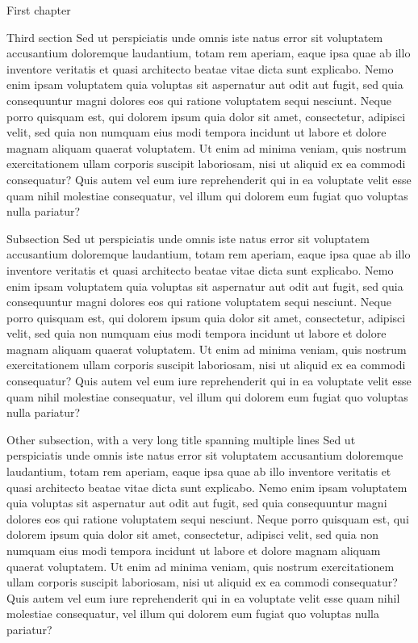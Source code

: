 \documentclass{article}
\begin{document}
\begin{mychapter}{First chapter}
	\begin{mysection}{Third section}
Sed ut perspiciatis unde omnis iste natus error sit voluptatem accusantium doloremque laudantium, totam rem aperiam, eaque ipsa quae ab illo inventore veritatis et quasi architecto beatae vitae dicta sunt explicabo. Nemo enim ipsam voluptatem quia voluptas sit aspernatur aut odit aut fugit, sed quia consequuntur magni dolores eos qui ratione voluptatem sequi nesciunt. Neque porro quisquam est, qui dolorem ipsum quia dolor sit amet, consectetur, adipisci velit, sed quia non numquam eius modi tempora incidunt ut labore et dolore magnam aliquam quaerat voluptatem. Ut enim ad minima veniam, quis nostrum exercitationem ullam corporis suscipit laboriosam, nisi ut aliquid ex ea commodi consequatur? Quis autem vel eum iure reprehenderit qui in ea voluptate velit esse quam nihil molestiae consequatur, vel illum qui dolorem eum fugiat quo voluptas nulla pariatur?
	\begin{mysubsection}{Subsection}
	Sed ut perspiciatis unde omnis iste natus error sit voluptatem accusantium doloremque laudantium, totam rem aperiam, eaque ipsa quae ab illo inventore veritatis et quasi architecto beatae vitae dicta sunt explicabo. Nemo enim ipsam voluptatem quia voluptas sit aspernatur aut odit aut fugit, sed quia consequuntur magni dolores eos qui ratione voluptatem sequi nesciunt. Neque porro quisquam est, qui dolorem ipsum quia dolor sit amet, consectetur, adipisci velit, sed quia non numquam eius modi tempora incidunt ut labore et dolore magnam aliquam quaerat voluptatem. Ut enim ad minima veniam, quis nostrum exercitationem ullam corporis suscipit laboriosam, nisi ut aliquid ex ea commodi consequatur? Quis autem vel eum iure reprehenderit qui in ea voluptate velit esse quam nihil molestiae consequatur, vel illum qui dolorem eum fugiat quo voluptas nulla pariatur?
	\end{mysubsection}
	\begin{mysubsection}{Other subsection, with a very long title spanning multiple lines}
	Sed ut perspiciatis unde omnis iste natus error sit voluptatem accusantium doloremque laudantium, totam rem aperiam, eaque ipsa quae ab illo inventore veritatis et quasi architecto beatae vitae dicta sunt explicabo. Nemo enim ipsam voluptatem quia voluptas sit aspernatur aut odit aut fugit, sed quia consequuntur magni dolores eos qui ratione voluptatem sequi nesciunt. Neque porro quisquam est, qui dolorem ipsum quia dolor sit amet, consectetur, adipisci velit, sed quia non numquam eius modi tempora incidunt ut labore et dolore magnam aliquam quaerat voluptatem. Ut enim ad minima veniam, quis nostrum exercitationem ullam corporis suscipit laboriosam, nisi ut aliquid ex ea commodi consequatur? Quis autem vel eum iure reprehenderit qui in ea voluptate velit esse quam nihil molestiae consequatur, vel illum qui dolorem eum fugiat quo voluptas nulla pariatur?
	\end{mysubsection}
	\end{mysection}
	\end{mychapter}
\end{document}
